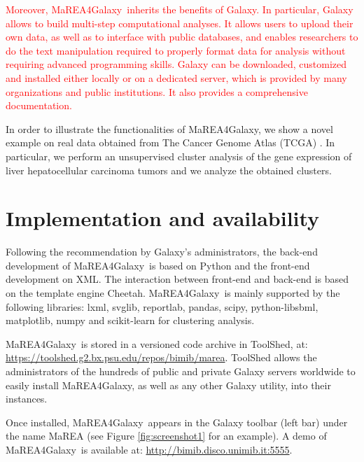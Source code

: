 \documentclass[preprint,12pt,authoryear]{elsarticle}
\newcommand{\red}{\textcolor{red}}
\newcommand{\mareagalaxy}{\textsf{MaREA4Galaxy}}
\begin{document}
\red{Moreover, \mareagalaxy\ inherits the benefits of Galaxy.  In
  particular, Galaxy allows to build multi-step computational
  analyses. It allows users to upload their own data, as well as to
  interface with public databases, and enables researchers to do the
  text manipulation required to properly format data for analysis
  without requiring advanced programming skills.  Galaxy can be
  downloaded, customized and installed either locally or on a
  dedicated server, which is provided by many organizations and public
  institutions. It also provides a comprehensive documentation.}

In order to illustrate the functionalities of \mareagalaxy, we show a
novel example on real data obtained from The Cancer Genome Atlas
(TCGA) \citep{TCGA}. In particular, we perform an unsupervised cluster
analysis of the gene expression of liver hepatocellular carcinoma
tumors and we analyze the obtained clusters.


\section{Implementation and availability}

Following the recommendation by Galaxy's administrators, the back-end
development of \mareagalaxy\ is based on Python and the front-end
development on XML. The interaction between front-end and back-end is
based on the template engine Cheetah.
%
\mareagalaxy\ is mainly supported by the following libraries:  lxml,
svglib, reportlab, pandas, scipy, python-libsbml, matplotlib, numpy
and scikit-learn for clustering analysis.

\mareagalaxy\ is stored in a versioned code archive in ToolShed, at:\\
\url{https://toolshed.g2.bx.psu.edu/repos/bimib/marea}. 
ToolShed allows the administrators of the hundreds of public and
private Galaxy servers worldwide to easily install \mareagalaxy, as
well as any other Galaxy utility, into their instances.

Once installed, \mareagalaxy\ appears in the Galaxy toolbar (left bar)
under the name \textsf{MaREA} (see Figure \ref{fig:screenshot1} for an
example).  A demo of \mareagalaxy\ is available at:
\url{http://bimib.disco.unimib.it:5555}.
\end{document}
